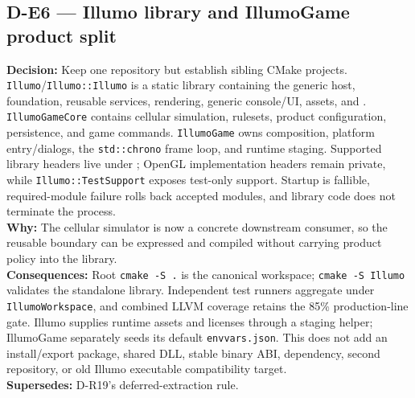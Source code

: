 \subsection*{D-E6 --- Illumo library and IllumoGame product split}
\begin{decisionbox}[title={D-E6 \quad 2026-08-18}]
\textbf{Decision:} Keep one repository but establish sibling CMake projects.
\texttt{Illumo}/\texttt{Illumo::Illumo} is a static library containing the
generic host, foundation, reusable services, rendering, generic console/UI,
assets, and . \texttt{IllumoGameCore} contains cellular
simulation, rulesets, product configuration, persistence, and game commands.
\texttt{IllumoGame} owns composition, platform entry/dialogs, the
\texttt{std::chrono} frame loop, and runtime staging. Supported library headers
live under ; OpenGL implementation headers remain
private, while \texttt{Illumo::TestSupport} exposes test-only support. Startup
is fallible, required-module failure rolls back accepted modules, and library
code does not terminate the process.\\
\textbf{Why:} The cellular simulator is now a concrete downstream consumer, so
the reusable boundary can be expressed and compiled without carrying product
policy into the library.\\
\textbf{Consequences:} Root \texttt{cmake -S .} is the canonical workspace;
\texttt{cmake -S Illumo} validates the standalone library. Independent test
runners aggregate under \texttt{IllumoWorkspace}, and combined LLVM coverage
retains the 85\% production-line gate. Illumo supplies runtime assets and
licenses through a staging helper; IllumoGame separately seeds its default
\texttt{envvars.json}. This does not add an install/export package, shared DLL,
stable binary ABI, dependency, second repository, or old Illumo executable
compatibility target.\\
\textbf{Supersedes:} D-R19's deferred-extraction rule.
\end{decisionbox}

